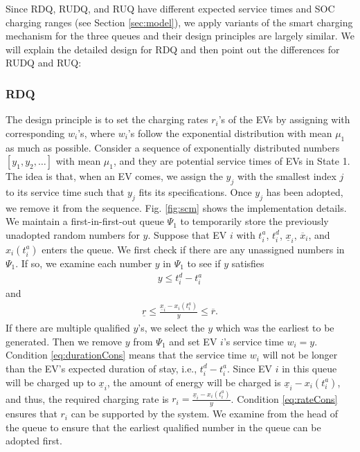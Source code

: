 \documentclass[journal]{IEEEtran}
\begin{document}
Since RDQ, RUDQ, and RUQ have different expected service times and SOC charging ranges (see Section \ref{sec:model}), we apply variants of the smart charging mechanism for the three queues and their design principles are largely similar. We will explain the detailed design for RDQ and then point out the differences for RUDQ and RUQ:

\subsubsection{RDQ}
The design principle is to set the charging rates $r_i$'s of the EVs by assigning with corresponding $w_i$'s, where $w_i$'s follow the exponential distribution with mean $\mu_1$ as much as possible.   
Consider a sequence of exponentially distributed numbers $[y_1,y_2,\ldots]$ with mean $\mu_1$, and they are potential service times of  EVs in State 1. The idea is that, when an EV comes, we assign the $y_j$ with the smallest index $j$ to its service time such that $y_j$ fits its specifications. Once $y_j$ has been adopted, we remove it from the sequence.
Fig. \ref{fig:scm} shows the implementation details. We maintain a first-in-first-out queue $\Psi_1$ to temporarily store the previously unadopted random numbers for $y$.
Suppose that EV $i$ with $t_i^a$, $t_i^d$, $\underline{x}_i$, $\overline{x}_i$, and $x_i(t_i^a)$ enters the queue. We first check if there are any unassigned numbers in $\Psi_1$. If so, we examine each number $y$ in $\Psi_1$ to see if $y$ satisfies 
\begin{align}
y\leq t_i^d - t_i^a
\label{eq:durationCons}
\end{align}
and
\begin{align}
\underline{r}\leq \frac{\underline{x}_i - x_i(t_i^a)}{y} \leq \overline{r}.
\label{eq:rateCons}
\end{align}
If there are multiple qualified $y$'s, we select the $y$ which was the earliest to be generated. Then we remove $y$ from $\Psi_1$ and set EV $i$'s service time $w_i = y$. 
Condition \eqref{eq:durationCons} means that the service time $w_i$ will not be longer than the EV's expected duration of stay, i.e., $t_i^d - t_i^a$. Since  EV $i$ in this queue will be charged up to $\underline{x}_i$,  the amount of energy will be charged  is $\underline{x}_i - x_i(t_i^a)$, and thus, the required charging rate is $r_i=\frac{\underline{x}_i - x_i(t_i^a)}{y}$.  Condition \eqref{eq:rateCons} ensures that $r_i$ can be supported by the system.
We examine from the head of the queue to ensure that the earliest qualified number in the queue can be adopted first. 
\end{document}
